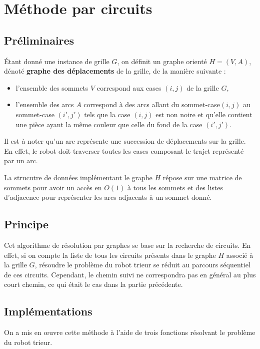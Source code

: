 \documentclass[12pt,a4paper]{article}
\begin{document}
\section{M\'ethode par circuits}
\subsection*{Pr\'eliminaires}
\'Etant donn\'e une instance de grille $G$, on d\'efinit un graphe orient\'e $H 
= (V,A)$, d\'enot\'e {\bfseries graphe des d\'eplacements} de la grille, de la 
mani\`ere suivante :
\begin{itemize}
\item l'ensemble des sommets $V$ correspond aux cases $(i,j)$ de la grille $G$,
\item l'ensemble des arcs $A$ correspond \`a des arcs allant du 
sommet-case$(i,j)$ au sommet-case $(i',j')$ tels que la case $(i,j)$ est non 
noire et qu'elle contient une pi\`ece ayant la m\^eme couleur que celle du fond 
de la case $(i',j')$.
\end{itemize}

Il est \`a noter qu'un arc repr\'esente une succession de d\'eplacements sur la 
grille. En effet, le robot doit traverser toutes les cases composant le trajet 
repr\'esent\'e par un arc.

La strucutre de donn\'ees impl\'ementant le graphe $H$ r\'epose sur une matrice 
de sommets pour avoir un acc\`es en $O(1)$ \`a tous les sommets et des listes 
d'adjacence pour repr\'esenter les arcs adjacents \`a un sommet donn\'e. 

\subsection*{Principe}
Cet algorithme de r\'esolution par graphes se base sur la recherche de 
circuits. En effet, si on compte la liste de tous les circuits pr\'esents dans 
le graphe $H$ associ\'e \`a la grille $G$, r\'esoudre le probl\`eme du robot 
trieur se r\'eduit au parcours s\'equentiel de ces circuits. Cependant, le 
chemin suivi ne correspondra pas en g\'en\'eral au plus court chemin, ce qui 
\'etait le cas dans la partie pr\'ec\'edente.

\subsection*{Impl\'ementations}
On a mis en \oe uvre cette m\'ethode \`a l'aide de trois fonctions r\'esolvant 
le probl\`eme du robot trieur.
\end{document}
